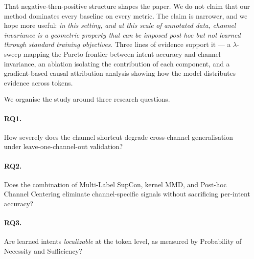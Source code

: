 \documentclass[preprint,12pt,authoryear]{elsarticle}
\begin{document}
That negative-then-positive structure shapes the paper. We do not
claim that our method dominates every baseline on every metric. The
claim is narrower, and we hope more useful: \emph{in this setting,
and at this scale of annotated data, channel invariance is a
geometric property that can be imposed post hoc but not learned
through standard training objectives.} Three lines of evidence
support it --- a $\lambda$-sweep mapping the Pareto frontier between
intent accuracy and channel invariance, an ablation isolating the
contribution of each component, and a gradient-based causal
attribution analysis showing how the model distributes evidence
across tokens.

We organise the study around three research questions.

\paragraph*{RQ1.} How severely does the channel shortcut degrade
cross-channel generalisation under leave-one-channel-out validation?

\paragraph*{RQ2.} Does the combination of Multi-Label SupCon, kernel
MMD, and Post-hoc Channel Centering eliminate channel-specific
signals without sacrificing per-intent accuracy?

\paragraph*{RQ3.} Are learned intents \emph{localizable} at the token
level, as measured by Probability of Necessity and Sufficiency?
\end{document}
